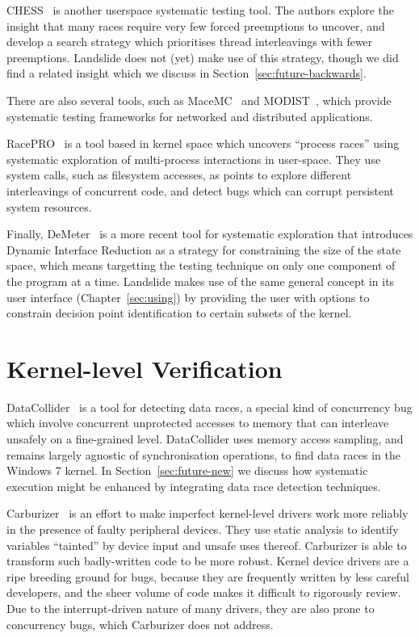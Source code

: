 CHESS~\cite{chess} is another userspace systematic testing tool. The authors explore the insight that many races require very few forced preemptions to uncover, and develop a search strategy which prioritises thread interleavings with fewer preemptions. Landslide does not (yet) make use of this strategy, though we did find a related insight which we discuss in Section~\ref{sec:future-backwards}.

There are also several tools, such as MaceMC~\cite{macemc} and MODIST~\cite{modist}, which provide systematic testing frameworks for networked and distributed applications.

RacePRO~\cite{racepro} is a tool based in kernel space which uncovers ``process races''  using systematic exploration of multi-process interactions in user-space. They use system calls, such as filesystem accesses, as points to explore different interleavings of concurrent code, and detect bugs which can corrupt persistent system resources.

Finally, DeMeter~\cite{demeter} is a more recent tool for systematic exploration that introduces Dynamic Interface Reduction as a strategy for constraining the size of the state space, which means targetting the testing technique on only one component of the program at a time. Landslide makes use of the same general concept in its user interface (Chapter~\ref{sec:using}) by providing the user with options to constrain decision point identification to certain subsets of the kernel.

\section{Kernel-level Verification}

DataCollider~\cite{datacollider} is a tool for detecting data races, a special kind of concurrency bug which involve concurrent unprotected accesses to memory that can interleave unsafely on a fine-grained level.
DataCollider uses memory access sampling, and remains largely agnostic of synchronisation operations, to find data races in the Windows 7 kernel.
In Section~\ref{sec:future-new} we discuss how systematic execution might be enhanced by integrating data race detection techniques.

Carburizer~\cite{carburizer} is an effort to make imperfect kernel-level drivers work more reliably in the presence of faulty peripheral devices. They use static analysis to identify variables ``tainted'' by device input and unsafe uses thereof. Carburizer is able to transform such badly-written code to be more robust.
Kernel device drivers are a ripe breeding ground for bugs, because they are frequently written by less careful developers, and the sheer volume of code makes it difficult to rigorously review.
Due to the interrupt-driven nature of many drivers, they are also prone to concurrency bugs, which Carburizer does not address.

